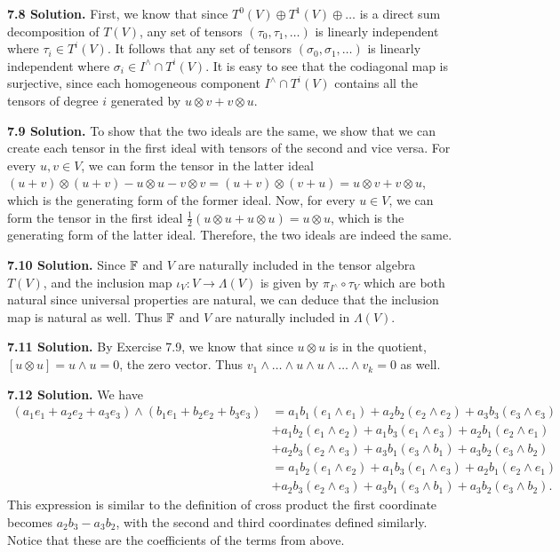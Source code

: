 \textbf{7.8 Solution.} First, we know that since $T^0(V) \oplus T^1(V) \oplus \dots$ is a direct sum decomposition of $T(V)$, any set of tensors $(\tau_0, \tau_1, \dots)$ is linearly independent where $\tau_i \in T^i(V)$. It follows that any set of tensors $(\sigma_0, \sigma_1, \dots)$ is linearly independent where $\sigma_i \in I^{\wedge} \cap T^i(V)$. It is easy to see that the codiagonal map is surjective, since each homogeneous component $I^{\wedge} \cap T^i(V)$ contains all the tensors of degree $i$ generated by $u \otimes v + v \otimes u$.

\textbf{7.9 Solution.} To show that the two ideals are the same, we show that we can create each tensor in the first ideal with tensors of the second and vice versa. For every $u, v \in V$, we can form the tensor in the latter ideal $(u + v) \otimes (u + v) - u \otimes u - v \otimes v = (u + v) \otimes (v + u) = u \otimes v + v \otimes u$, which is the generating form of the former ideal. Now, for every $u \in V$, we can form the tensor in the first ideal $\frac{1}{2}(u \otimes u + u \otimes u) = u \otimes u$, which is the generating form of the latter ideal. Therefore, the two ideals are indeed the same.

\textbf{7.10 Solution.} Since $\mathbb{F}$ and $V$ are naturally included in the tensor algebra $T(V)$, and the inclusion map $\iota_V: V \to \Lambda(V)$ is given by $\pi_{I^{\wedge}} \circ \tau_V$ which are both natural since universal properties are natural, we can deduce that the inclusion map is natural as well. Thus $\mathbb{F}$ and $V$ are naturally included in $\Lambda(V)$.

\textbf{7.11 Solution.} By Exercise 7.9, we know that since $u \otimes u$ is in the quotient, $[u \otimes u] = u \wedge u = 0$, the zero vector. Thus $v_1 \wedge \dots \wedge u \wedge u \wedge \dots \wedge v_k = 0$ as well.

\textbf{7.12 Solution.} We have
\begin{align*}
    (a_1e_1 + a_2e_2 + a_3e_3) \wedge (b_1e_1 + b_2e_2 + b_3e_3) &= a_1b_1(e_1 \wedge e_1) + a_2b_2(e_2 \wedge e_2) + a_3b_3(e_3 \wedge e_3) \\
    &+ a_1b_2(e_1 \wedge e_2) + a_1b_3(e_1 \wedge e_3) + a_2b_1(e_2 \wedge e_1) \\
    &+ a_2b_3(e_2 \wedge e_3) + a_3b_1(e_3 \wedge b_1) + a_3b_2(e_3 \wedge b_2) \\
    &= a_1b_2(e_1 \wedge e_2) + a_1b_3(e_1 \wedge e_3) + a_2b_1(e_2 \wedge e_1) \\
    &+ a_2b_3(e_2 \wedge e_3) + a_3b_1(e_3 \wedge b_1) + a_3b_2(e_3 \wedge b_2).
\end{align*}
This expression is similar to the definition of cross product the first coordinate becomes $a_2b_3 - a_3b_2$, with the second and third coordinates defined similarly. Notice that these are the coefficients of the terms from above.

